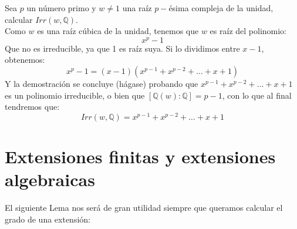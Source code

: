 \begin{ejercicio} %
    Sea $p$ un número primo y $w\neq 1$ una raíz $p-$ésima compleja de la unidad, calcular $Irr(w,\mathbb{Q})$.\\

    \noindent
    Como $w$ es una raíz cúbica de la unidad, tenemos que $w$ es raíz del polinomio:
    \begin{equation*}
        x^p - 1
    \end{equation*}
    Que no es irreducible, ya que 1 es raíz suya. Si lo dividimos entre $x-1$, obtenemos:
    \begin{equation*}
        x^p-1 = (x-1)(x^{p-1} + x^{p-2} + \ldots + x + 1)
    \end{equation*}
    Y la demostración se concluye (hágase) probando que $x^{p-1}+x^{p-2}+\ldots+x+1$ es un polinomio irreducible, o bien que $[\mathbb{Q}(w) : \mathbb{Q}] = p-1$, con lo que al final tendremos que:
    \begin{equation*}
        Irr(w,\mathbb{Q}) = x^{p-1}+x^{p-2}+\ldots+x+1
    \end{equation*}
\end{ejercicio}

\section{Extensiones finitas y extensiones algebraicas}
\noindent
El siguiente Lema nos será de gran utilidad siempre que queramos calcular el grado de una extensión:

